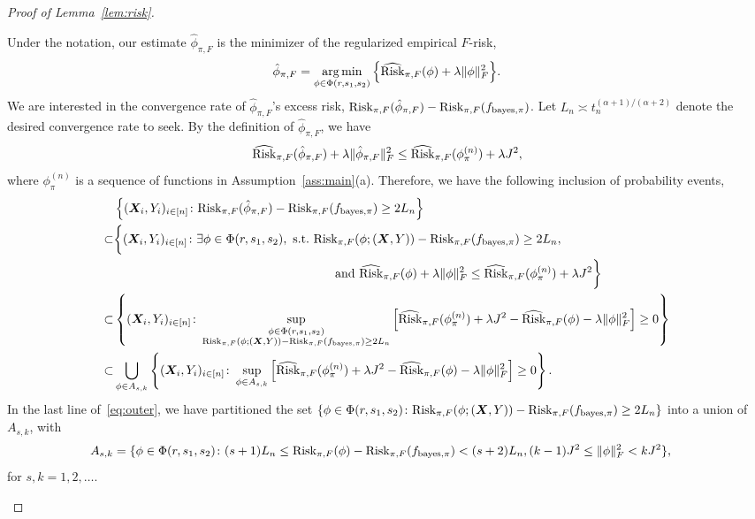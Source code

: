 \documentclass[11pt]{article}
\theoremstyle{plain}
\theoremstyle{definition}
\def\bayespif{f_{\textup{bayes},\pi}}
\def\riskF{\textup{Risk}_{\pi,F}}
\def\eriskF{\widehat{\textup{Risk}}_{\pi,F}}
\begin{document}
\begin{proof}[Proof of Lemma~\ref{lem:risk}]
\begin{enumerate}[label={2.\arabic*},wide, labelwidth=!, labelindent=0pt]
Under the notation, our estimate $\hat \phi_{\pi,F}$ is the minimizer of the regularized empirical $F$-risk,
\begin{equation}\label{eq:def2}
\hat \phi_{\pi,F}=\argmin_{\phi\in\Phi(r,s_1,s_2)}\Big\{ \eriskF(\phi)+\lambda\FnormSize{}{\phi}^2\Big\}.
\end{equation}
We are interested in the convergence rate of $\hat \phi_{\pi,F}$'s excess risk, $\riskF(\hat\phi_{\pi,F})-\riskF(\bayespif)$. Let $L_n\asymp t_n^{(\alpha+1)/(\alpha+2)}$ denote the desired convergence rate to seek. By the definition of $\hat \phi_{\pi,F}$, we have
\[
 \eriskF(\hat\phi_{\pi,F})+\lambda\FnormSize{}{\hat \phi_{\pi,F}}^2\leq \eriskF(\phi_{\pi}^{(n)})+\lambda J^2,
\]
where $\phi_{\pi}^{(n)}$ is a sequence of functions in Assumption~\ref{ass:main}(a). Therefore, we have the following inclusion of probability events,
\begin{align}\label{eq:outer}
&\left\{(\mX_i,Y_i)_{i\in[n]}\colon \riskF(\hat\phi_{\pi,F})-\riskF(\bayespif)\geq 2L_n \right\}\notag \\
 \subset &
 \bigg\{(\mX_i,Y_i)_{i\in[n]}\colon \exists \phi\in\Phi(r,s_1,s_2),\ \text{s.t.}\  \riskF(\phi; (\mX,Y))-\riskF(\bayespif)\geq 2L_n, \notag \\&\hspace*{6.3cm} \text{and}\  \eriskF(\phi)+\lambda\FnormSize{}{\phi}^2\leq \eriskF(\phi_{\pi}^{(n)})+\lambda J^2 \bigg\}\notag \\
 \subset &
\left\{(\mX_i,Y_i)_{i\in[n]} \colon \sup_{\substack{\phi\in\Phi(r,s_1,s_2)\\  
\riskF(\phi; (\mX,Y))-\riskF(\bayespif)\geq 2L_n  }}\left[\eriskF(\phi_\pi^{(n)})+\lambda J^2-\eriskF(\phi)-\lambda\FnormSize{}{\phi}^2\right]\geq 0\right\} \notag \\
\subset & \bigcup_{\phi\in A_{s,k}}\left\{(\mX_i,Y_i)_{i\in[n]}\colon \sup_{\phi\in A_{s,k}} \left[\eriskF(\phi_\pi^{(n)})+\lambda J^2-\eriskF(\phi)- \lambda\FnormSize{}{\phi}^2\right] \geq 0 \right \}.
\end{align}
In the last line of~\eqref{eq:outer}, we have partitioned the set $\{\phi\in\Phi(r,s_1,s_2)\colon \riskF(\phi; (\mX,Y))-\riskF(\bayespif)\geq 2L_n\}$ into a union of $A_{s,k}$, with 
\begin{align}
A_{s,k}&=\{\phi\in \Phi(r,s_1,s_2)\colon (s+1)L_n\leq \riskF(\phi)-\riskF(\bayespif)< (s+2) L_n, (k-1) J^2 \leq \FnormSize{}{\phi}^2< k J^2\},
\end{align}
for $s,k=1,2,\ldots$. 



\end{enumerate}
\end{proof}
\end{document}
